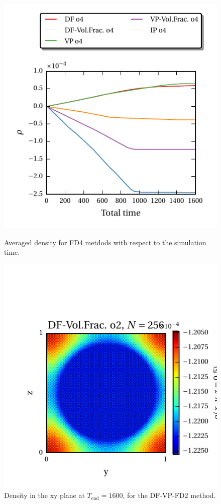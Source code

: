\begin{figure}[!bp]
  \begin{minipage}[c]{0.5\textwidth}
      \includegraphics{gfx/immersed_boundary/hpflow/long/ts.pdf}
      \caption{\label{hpflow:results_long_ts}
            Averaged density for FD4 metdods with respect to the simulation time.
          }
  \end{minipage}
  \begin{minipage}[c]{0.5\textwidth}
      \includegraphics{gfx/immersed_boundary/hpflow/long/example.pdf}
      \caption{\label{hpflow:results_long_example}
        Density in the xy plane at $T_{\text{end}}=1600$, for the DF-VP-FD2 method.
      }
  \end{minipage}
\end{figure}


